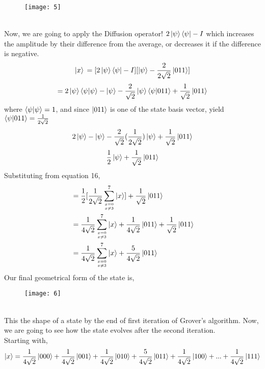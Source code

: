 \documentclass[11pt]{article}
\begin{document}
\begin{figure}[h!]
	\texttt{[image: 5]}
	\centering
\end{figure} \\
Now, we are going to apply the Diffusion operator! $2\ket{\psi}\bra{\psi}-I$ which increases the amplitude by their difference from the average, or decreases it if the difference is negative. 
\begin{equation}
[2\ket{\psi}\bra{\psi}-I]\ket{x}\\
= [2\ket{\psi}\bra{\psi}-I][\ket{\psi} - \frac{2}{2\sqrt{2}}\ket{011}]
\end{equation}
\begin{equation}
= 2\ket{\psi}\braket{\psi|\psi}-\ket{\psi} - \frac{2}{\sqrt{2}}\ket{\psi}\braket{\psi | 011}+\frac{1}{\sqrt{2}}\ket{011}
\end{equation}
where $\braket{\psi|\psi} = 1$, and since $\ket{011}$ is one of the state basis vector, yield $\braket{\psi|011} = \frac{1}{2\sqrt{2}}$
\begin{equation}
2\ket{\psi} - \ket{\psi} - \frac{2}{\sqrt{2}}(\frac{1}{2\sqrt{2}})\ket{\psi}+\frac{1}{\sqrt{2}}\ket{011}
\end{equation}
\begin{equation}
\frac{1}{2}\ket{\psi} + \frac{1}{\sqrt{2}}\ket{011}
\end{equation}
Substituting from equation 16,
\begin{align}
&= \frac{1}{2}[\frac{1}{2\sqrt{2}}\sum_{{x=0 \atop x\neq 3} }^{7}\ket{x}]+\frac{1}{\sqrt{2}}\ket{011}  \\
&= \frac{1}{4\sqrt{2}}\sum_{x=0 \atop x\neq 3}^{7}\ket{x}+\frac{1}{4\sqrt{2}}\ket{011} + \frac{1}{\sqrt{2}}\ket{011}\\
&= \frac{1}{4\sqrt{2}}\sum_{x=0 \atop x\neq 3}^{7}\ket{x}+\frac{5}{4\sqrt{2}}\ket{011}
\end{align}
Our final geometrical form of the state is,
\begin{figure}[h!]
	\texttt{[image: 6]}
	\centering
\end{figure} \\
This the shape of a state by the end of first iteration of Grover's algorithm. Now, we are going to see how the state evolves after the second iteration.\\
Starting with,
\begin{equation*}
\ket{x} = \frac{1}{4\sqrt{2}} \ket{000} +\frac{1}{4\sqrt{2}}\ket{001} + \frac{1}{4\sqrt{2}}\ket{010} + \frac{5}{4\sqrt{2}}\ket{011}  + \frac{1}{4\sqrt{2}} \ket{100} +...+ \frac{1}{4\sqrt{2}}\ket{111}
\end{equation*} 
\end{document}
